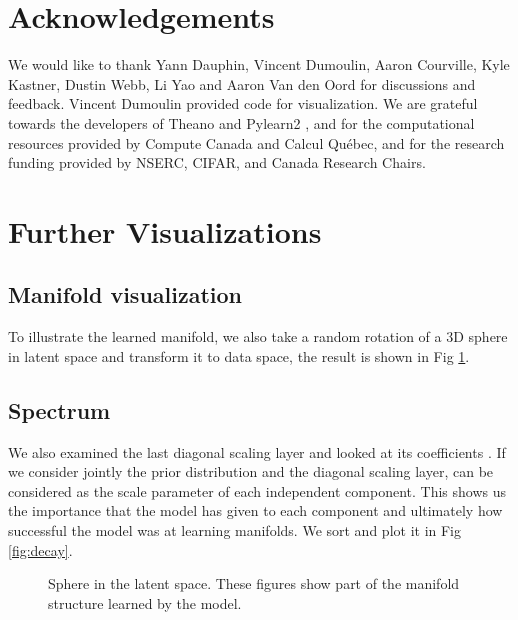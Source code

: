 \documentclass{article}
\begin{document}
\section*{Acknowledgements} 
We would like to thank Yann Dauphin, Vincent Dumoulin, Aaron Courville, Kyle Kastner, Dustin Webb, Li Yao
and Aaron Van den Oord for discussions and feedback. Vincent Dumoulin provided code for visualization.
We are grateful towards the developers of Theano 
\citep{bergstra+all-Theano-NIPS2011, Bastien-Theano-2012} and Pylearn2 \citep{pylearn2_arxiv_2013},
and for the computational resources provided by Compute Canada and Calcul Québec, and for the
research funding provided by NSERC, CIFAR, and Canada Research Chairs.




\newpage
\appendix
\section{Further Visualizations}

\subsection{Manifold visualization}
To illustrate the learned manifold, we
also take a random rotation  of a 3D sphere  in latent space
and transform it to data space, the result 
is shown in Fig \ref{fig:map}.

\subsection{Spectrum}
We also examined the last diagonal scaling layer and looked at its
coefficients . If we consider jointly the prior
distribution and the diagonal scaling layer,  can
be considered as the scale parameter of each independent component. This shows us
the importance that the model has given to each component
and ultimately how successful the model was at learning manifolds. We sort
 and plot it in Fig \ref{fig:decay}.

\begin{figure}
    \centering {}
    \caption{Sphere in the latent space.
        These figures show part of the manifold structure learned by the model.
        }
    \label{fig:map}
\end{figure}
\end{document}
